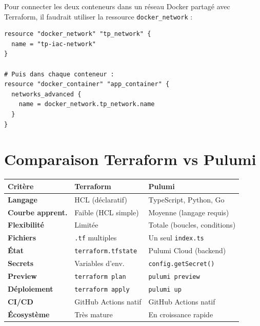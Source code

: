 \documentclass[12pt,a4paper]{article}
\begin{document}
Pour connecter les deux conteneurs dans un réseau Docker partagé avec
Terraform, il faudrait utiliser la ressource \texttt{docker\_network} :

\begin{lstlisting}[style=hclStyle, caption=Réseau Docker dans Terraform]
resource "docker_network" "tp_network" {
  name = "tp-iac-network"
}

# Puis dans chaque conteneur :
resource "docker_container" "app_container" {
  networks_advanced {
    name = docker_network.tp_network.name
  }
}
\end{lstlisting}

\section{Comparaison Terraform vs Pulumi}

\begin{center}
\begin{tabular}{>{\bfseries}p{4cm}
    >{\centering\arraybackslash}p{4cm}
    >{\centering\arraybackslash}p{5cm}}
\toprule
Critère &
\textcolor{terraformPurple}{\textbf{Terraform}} &
\textcolor{pulumiBlue}{\textbf{Pulumi}} \\
\midrule
Langage        & HCL (déclaratif)           & TypeScript, Python, Go \\
Courbe apprent.& Faible (HCL simple)        & Moyenne (langage requis) \\
Flexibilité    & Limitée                    & Totale (boucles, conditions) \\
Fichiers       & \texttt{.tf} multiples     & Un seul \texttt{index.ts} \\
État           & \texttt{terraform.tfstate} & Pulumi Cloud (backend) \\
Secrets        & Variables d'env.           & \texttt{config.getSecret()} \\
Preview        & \texttt{terraform plan}    & \texttt{pulumi preview} \\
Déploiement    & \texttt{terraform apply}   & \texttt{pulumi up} \\
CI/CD          & GitHub Actions natif       & GitHub Actions natif \\
Écosystème     & Très mature                & En croissance rapide \\
\bottomrule
\end{tabular}
\end{center}
\end{document}
